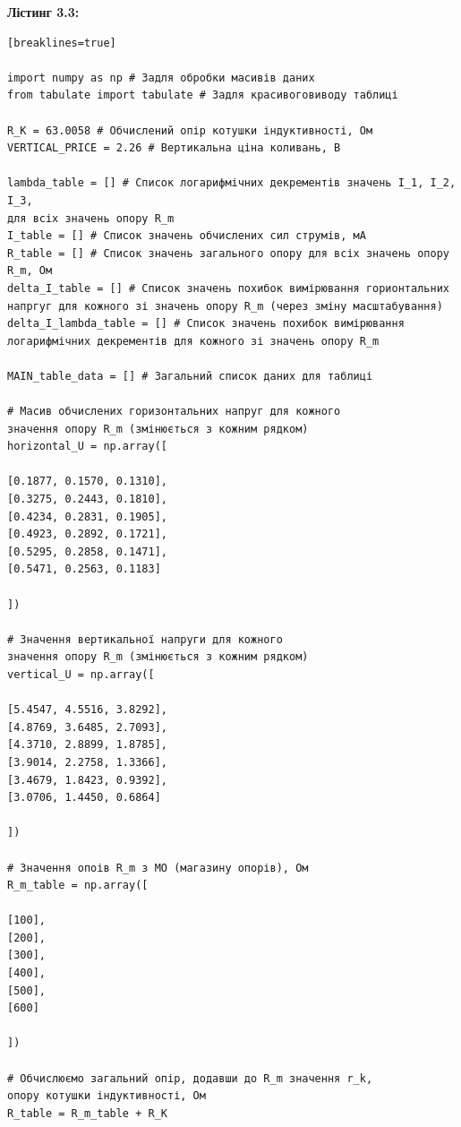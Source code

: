 \documentclass[12pt,a4paper]{article}
\begin{document}
    \vspace{3em}

    \hypertarget{listing3}{}

    \textbf{\large Лістинг 3.3:}

    \vspace{1em}

    \small{

    \begin{verbatim}[breaklines=true]

import numpy as np # Задля обробки масивів даних
from tabulate import tabulate # Задля красивоговиводу таблиці

R_K = 63.0058 # Обчислений опір котушки індуктивності, Ом
VERTICAL_PRICE = 2.26 # Вертикальна ціна коливань, В

lambda_table = [] # Список логарифмічних декрементів значень I_1, I_2, I_3,
для всіх значень опору R_m
I_table = [] # Список значень обчислених сил струмів, мА
R_table = [] # Список значень загального опору для всіх значень опору R_m, Ом
delta_I_table = [] # Список значень похибок вимірювання горионтальних
напргуг для кожного зі значень опору R_m (через зміну масштабування)
delta_I_lambda_table = [] # Список значень похибок вимірювання
логарифмічних декрементів для кожного зі значень опору R_m

MAIN_table_data = [] # Загальний список даних для таблиці

# Масив обчислених горизонтальних напруг для кожного
значення опору R_m (змінюється з кожним рядком)
horizontal_U = np.array([

[0.1877, 0.1570, 0.1310],
[0.3275, 0.2443, 0.1810],
[0.4234, 0.2831, 0.1905],
[0.4923, 0.2892, 0.1721],
[0.5295, 0.2858, 0.1471],
[0.5471, 0.2563, 0.1183]

])

# Значення вертикальної напруги для кожного
значення опору R_m (змінюється з кожним рядком)
vertical_U = np.array([

[5.4547, 4.5516, 3.8292],
[4.8769, 3.6485, 2.7093],
[4.3710, 2.8899, 1.8785],
[3.9014, 2.2758, 1.3366],
[3.4679, 1.8423, 0.9392],
[3.0706, 1.4450, 0.6864]

])

# Значення опоів R_m з МО (магазину опорів), Ом
R_m_table = np.array([

[100],
[200],
[300],
[400],
[500],
[600]

])

# Обчислюємо загальний опір, додавши до R_m значення r_k,
опору котушки індуктивності, Ом
R_table = R_m_table + R_K


\end{verbatim}}
\end{document}
